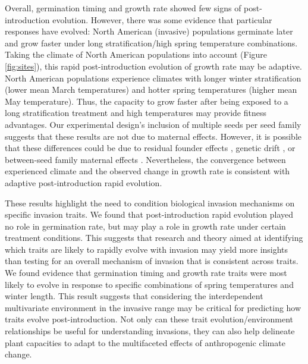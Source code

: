 \documentclass[12pt]{article}\usepackage[]{graphicx}\usepackage[]{color}
\begin{document}
	Overall, germination timing and growth rate showed few signs of post-introduction evolution. However, there was some evidence that particular responses have evolved: North American (invasive) populations germinate later and grow faster under long stratification/high spring temperature combinations. Taking the climate of North American populations into account (Figure \ref{fig:sites}), this rapid post-introduction evolution of growth rate may be adaptive. North American populations experience climates with longer winter stratification  (lower mean March temperatures) and hotter spring temperatures (higher mean May temperature). Thus, the capacity to grow faster after being exposed to a long stratification treatment and high temperatures may provide fitness advantages. Our experimental design's inclusion of multiple seeds per seed family suggests that these results are not due to maternal effects. However, it is  possible that these differences could be due to residual founder effects \parencite{Shirk2014}, genetic drift \parencite{Eckert1996}, or between-seed family maternal effects \parencite{Galloway2005}. Nevertheless, the convergence between experienced climate and the observed change in growth rate is consistent with adaptive post-introduction rapid evolution. 
	
	These results highlight the need to condition biological invasion mechanisms on specific invasion traits. We found that post-introduction rapid evolution played no role in germination rate, but may play a role in growth rate under certain treatment conditions. This suggests that research and theory aimed at identifying which traits are likely to rapidly evolve with invasion may yield more insights than testing for an overall mechanism of invasion that is consistent across traits. We found evidence that germination timing and growth rate traits were most likely to evolve in response to specific combinations of spring temperatures and winter length. This result suggests that considering the interdependent multivariate environment in the invasive range may be critical for predicting how traits evolve post-introduction. 
Not only can these trait evolution/environment relationships be useful for understanding invasions, they can also help delineate plant capacities to adapt to the multifaceted effects of anthropogenic climate change. 
	
\end{document}
